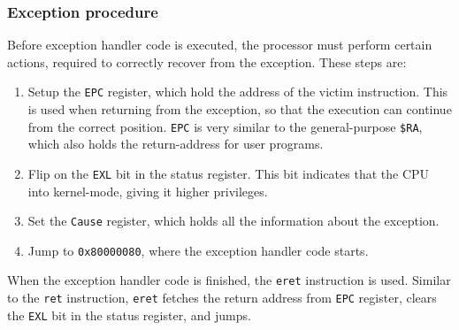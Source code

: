 \subsubsection{Exception procedure}
Before exception handler code is executed, the processor must perform certain
actions, required to correctly recover from the exception. These steps are\cite{see_mips_run}:
\begin{enumerate}
\item Setup the \texttt{EPC} register, which hold the address of the victim
instruction. This is used when returning from the exception, so that the
execution can continue from the correct position. \texttt{EPC} is very similar to the
general-purpose \texttt{\$RA}, which also holds the return-address for user
programs.
\item Flip on the \texttt{EXL} bit in the status register. This bit indicates
that the CPU into kernel-mode, giving it higher privileges.
\item Set the \texttt{Cause} register, which holds all the information about
the exception.
\item Jump to \texttt{0x80000080}, where the exception handler code starts.
\end{enumerate}
When the exception handler code is finished, the \texttt{eret} instruction is
used. Similar to the \texttt{ret} instruction, \texttt{eret} fetches the return
address from \texttt{EPC} register, clears the \texttt{EXL} bit in the status
register, and jumps.

